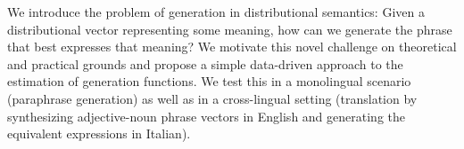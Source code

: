 We introduce the problem of generation in distributional semantics: Given a distributional vector representing some meaning, how can we generate the phrase that best expresses that meaning? We motivate this novel challenge on theoretical and practical grounds and propose a simple data-driven approach to the estimation of generation functions. We test this in a monolingual scenario (paraphrase generation) as well as in a cross-lingual setting (translation by synthesizing adjective-noun phrase vectors in English and generating the equivalent expressions in Italian).
